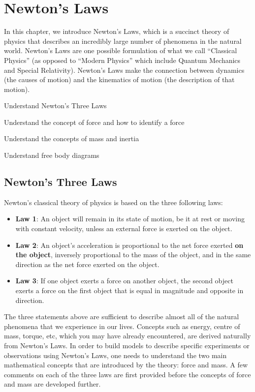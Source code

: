 
\chapter{Newton's Laws}
In this chapter, we introduce Newton's Laws, which is a succinct theory of physics that describes an incredibly large number of phenomena in the natural world. Newton's Laws are one possible formulation of what we call ``Classical Physics'' (as opposed to ``Modern Physics'' which include Quantum Mechanics and Special Relativity). Newton's Laws make the connection between dynamics (the causes of motion) and the kinematics of motion (the description of that motion). 
\label{chap:NewtonsLaws}
 \vspace{1cm}
\begin{learningObjectives}
\item Understand Newton's Three Laws
\item Understand the concept of force and how to identify a force
\item Understand the concepts of mass and inertia
\item Understand free body diagrams
\end{learningObjectives}

\section{Newton's Three Laws}
Newton's classical theory of physics is based on the three following laws:
\begin{itemize}
\item \textbf{Law 1}: An object will remain in its state of motion, be it at rest or moving with constant velocity, unless an external force is exerted on the object.
\item \textbf{Law 2}: An object's acceleration is proportional to the net force exerted \textbf{on the object}, inversely proportional to the mass of the object, and in the same direction as the net force exerted on the object.
\item \textbf{Law 3}: If one object exerts a force on another object, the second object exerts a force on the first object that is equal in magnitude and opposite in direction.
\end{itemize}
The three statements above are sufficient to describe almost all of the natural phenomena that we experience in our lives. Concepts such as energy, centre of mass, torque, etc, which you may have already encountered, are derived naturally from Newton's Laws. In order to build models to describe specific experiments or observations using Newton's Laws, one needs to understand the two main mathematical concepts that are introduced by the theory: force and mass. A few comments on each of the three laws are first provided before the concepts of force and mass are developed further.

